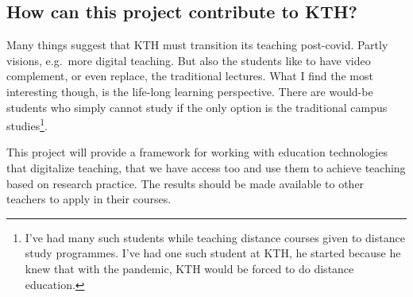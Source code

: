 %
%
%


\subsection{How can this project contribute to KTH?}

%
%

Many things suggest that KTH must transition its teaching post-covid.
Partly visions, e.g.~more digital teaching.
But also the students like to have video complement, or even replace, the 
traditional lectures.
What I find the most interesting though, is the life-long learning perspective.
There are would-be students who simply cannot study if the only option is the 
traditional campus studies\footnote{%
  I've had many such students while teaching distance courses given to distance 
  study programmes.
  I've had one such student at KTH, he started because he knew that with the 
  pandemic, KTH would be forced to do distance education.
}.

This project will provide a framework for working with education technologies 
that digitalize teaching, that we have access too and use them to achieve 
teaching based on research practice.
The results should be made available to other teachers to apply in their 
courses.

